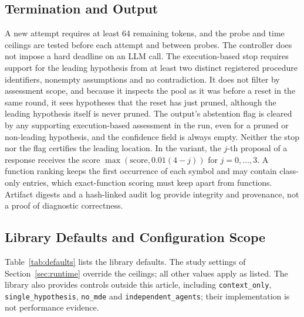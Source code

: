 \documentclass[a4paper,fleqn]{cas-sc}
\newcommand{\code}[1]{\texttt{\detokenize{#1}}}
\newcommand{\artifactpath}[1]{\nolinkurl{#1}}
\begin{document}
\subsection{Termination and Output}\label{app:termination}
A new attempt requires at least 64 remaining tokens, and the probe and time ceilings are tested before each attempt and between probes. The controller does not impose a hard deadline on an LLM call. The execution-based stop requires support for the leading hypothesis from at least two distinct registered procedure identifiers, nonempty assumptions and no contradiction. It does not filter by assessment scope, and because it inspects the pool as it was before a reset in the same round, it sees hypotheses that the reset has just pruned, although the leading hypothesis itself is never pruned. The output's abstention flag is cleared by any supporting execution-based assessment in the run, even for a pruned or non-leading hypothesis, and the confidence field is always empty. Neither the stop nor the flag certifies the leading location. In the \code{no_probes} variant, the $j$-th proposal of a response receives the score $\max(\mathrm{score},0.01(4-j))$ for $j=0,\ldots,3$. A function ranking keeps the first occurrence of each symbol and may contain class-only entries, which exact-function scoring must keep apart from functions. Artifact digests and a hash-linked audit log provide integrity and provenance, not a proof of diagnostic correctness.

\subsection{Library Defaults and Configuration Scope}\label{app:configuration-catalog}
Table~\ref{tab:defaults} lists the library defaults. The study settings of Section~\ref{sec:runtime} override the ceilings; all other values apply as listed. The library also provides controls outside this article, including \artifactpath{context_only}, \artifactpath{single_hypothesis}, \artifactpath{no_mde} and \artifactpath{independent_agents}; their implementation is not performance evidence.
\end{document}
